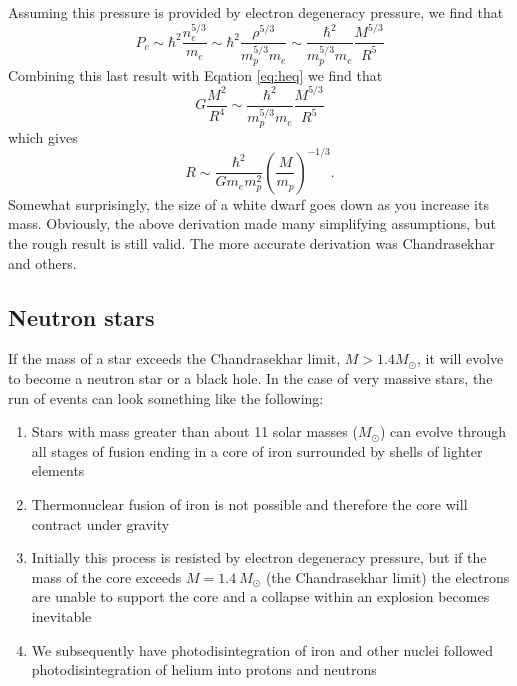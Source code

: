 \documentclass[a4paper,12pt]{article}
\theoremstyle{remark}
\renewcommand{\=}[1]{\stackrel{#1}{=}} %
\theoremstyle{plain}
\theoremstyle{definition}
\newtheorem*{definitionT}{Note}%
\newenvironment{note}{
\begin{dBox}
\begin{definitionT}}
{\end{definitionT}
\end{dBox}}
\begin{document}
Assuming this pressure is provided by electron degeneracy pressure, we find that 
\begin{equation}
P_c \sim \hbar^2 \frac{n_e ^{5/3}}{m_e} \sim \hbar^2 \frac{\rho ^{5/3}}{m_p^{5/3} m_e}  \sim \frac{\hbar^2}{m_p^{5/3} m_e} \frac{M^{5/3}}{R^5}
\end{equation}
Combining this last result with Eqation \ref{eq:heq} we find that 
\begin{equation}
G \frac{M^2}{R^4} \sim \frac{\hbar^2}{m_p^{5/3} m_e} \frac{M^{5/3}}{R^5}
\end{equation}
which gives
\begin{equation}
R \sim \frac{\hbar ^2}{G m_e m_p^2} \left( \frac{M}{m_p} \right)^{-1/3}.
\end{equation}
Somewhat surprisingly, the size of a white dwarf goes down as you increase its mass. Obviously, the above derivation made many simplifying assumptions, but the rough result is still valid. The more accurate derivation was Chandrasekhar and others. %


\subsection{Neutron stars}
\label{seq:neutron_star}
If the mass of a star exceeds the Chandrasekhar limit, \mbox{$M > 1.4 M_\odot$}, it will evolve to become a neutron star or a black hole. In the case of very massive stars, the run of events can look something like the following:
\begin{enumerate}
\item Stars with mass greater than about 11 solar masses ($M_\odot$) can evolve through all stages of fusion ending in a core of iron surrounded by shells of lighter elements
\item Thermonuclear fusion of iron is not possible and therefore the core will contract under gravity
\item Initially this process is resisted by electron degeneracy pressure, but if the mass of the core exceeds $M = 1.4 \: M_\odot$ (the Chandrasekhar limit) the electrons are unable to support the core and a collapse within an explosion becomes inevitable
\item We subsequently have photodisintegration of iron and other nuclei followed photodisintegration of helium into protons and neutrons
\end{enumerate}
\end{document}
